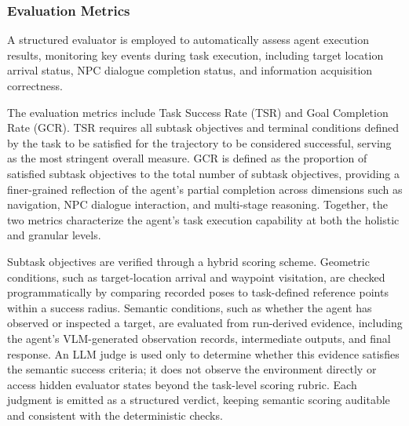 \subsubsection{Evaluation Metrics}\label{sec:evaluation_metrics}

A structured evaluator is employed to automatically assess agent execution results, monitoring key events during task execution, including target location arrival status, NPC dialogue completion status, and information acquisition correctness.

The evaluation metrics include Task Success Rate (TSR) and Goal Completion Rate (GCR). TSR requires all subtask objectives and terminal conditions defined by the task to be satisfied for the trajectory to be considered successful, serving as the most stringent overall measure. GCR is defined as the proportion of satisfied subtask objectives to the total number of subtask objectives, providing a finer-grained reflection of the agent's partial completion across dimensions such as navigation, NPC dialogue interaction, and multi-stage reasoning. Together, the two metrics characterize the agent's task execution capability at both the holistic and granular levels.

Subtask objectives are verified through a hybrid scoring scheme.
Geometric conditions, such as target-location arrival and waypoint
visitation, are checked programmatically by comparing recorded poses to
task-defined reference points within a success radius. Semantic
conditions, such as whether the agent has observed or inspected a target,
are evaluated from run-derived evidence, including the agent's
VLM-generated observation records, intermediate outputs, and final
response. An LLM judge is used only to determine whether this evidence
satisfies the semantic success criteria; it does not observe the
environment directly or access hidden evaluator states beyond the
task-level scoring rubric. Each judgment is emitted as a structured
verdict, keeping semantic scoring auditable and consistent with the
deterministic checks.